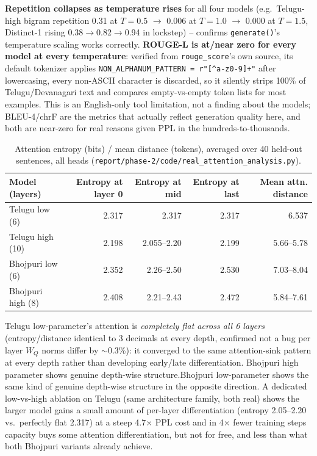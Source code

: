 \documentclass[10pt,a4paper]{article}
\begin{document}
\textbf{Repetition collapses as temperature rises} for all four models (e.g.\ Telugu-high
bigram repetition 0.31 at $T{=}0.5$ $\to$ 0.006 at $T{=}1.0$ $\to$ 0.000 at $T{=}1.5$, Distinct-1
rising 0.38$\to$0.82$\to$0.94 in lockstep) -- confirms \texttt{generate()}'s temperature scaling
works correctly. \textbf{ROUGE-L is at/near zero for every model at every temperature}: verified
from \texttt{rouge\_score}'s own source, its default tokenizer applies
\texttt{NON\_ALPHANUM\_PATTERN = r"[\^{}a-z0-9]+"} after lowercasing, every non-ASCII
character is discarded, so it silently strips 100\% of Telugu/Devanagari text and compares
empty-vs-empty token lists for most examples. This is an English-only tool limitation, not a
finding about the models; BLEU-4/chrF are the metrics that actually reflect
generation quality here, and both are near-zero for real reasons given PPL in the
hundreds-to-thousands.

\begin{table}[H]\centering\footnotesize
\begin{tabular}{lrrrr}
\toprule
Model (layers) & Entropy at layer 0 & Entropy at mid & Entropy at last & Mean attn. distance \\
\midrule
Telugu low (6)      & 2.317 & 2.317 & 2.317 & 6.537 \\
Telugu high (10)    & 2.198 & 2.055--2.20 & 2.199 & 5.66--5.78 \\
Bhojpuri low (6)    & 2.352 & 2.26--2.50 & 2.530 & 7.03--8.04 \\
Bhojpuri high (8)   & 2.408 & 2.21--2.43 & 2.472 & 5.84--7.61 \\
\bottomrule
\end{tabular}
\caption{Attention entropy (bits) / mean distance (tokens), averaged over 40 held-out
sentences, all heads (\texttt{report/phase-2/code/real\_attention\_analysis.py}).}
\label{tab:attn-p2}
\end{table}
\vspace{-8pt}

Telugu low-parameter's attention is \emph{completely flat across all 6 layers} (entropy/distance
identical to 3 decimals at every depth, confirmed not a bug per layer $W_Q$ norms differ by
$\sim$0.3\%): it converged to the same attention-sink pattern at every depth rather than
developing early/late differentiation. Bhojpuri high parameter shows genuine depth-wise
structure.Bhojpuri low-parameter
shows the same kind of genuine depth-wise structure in the opposite direction. A dedicated low-vs-high ablation on Telugu (same architecture family,
both real) shows the larger model gains a small amount of per-layer differentiation (entropy
2.05--2.20 vs.\ perfectly flat 2.317) at a steep 4.7$\times$ PPL cost and in 4$\times$ fewer
training steps capacity buys some attention differentiation, but not for free, and less than
what both Bhojpuri variants already achieve.
\end{document}
